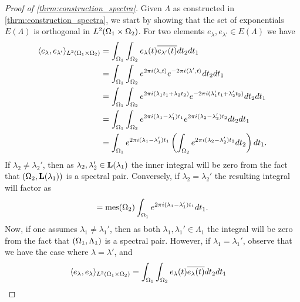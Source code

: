 \documentclass[../thesis.tex]{subfiles}
\begin{document}
\begin{proof}[Proof of  \cref{thrm:construction_spectra}] %
    Given $\Lambda$ as constructed in \cref{thrm:construction_spectra}, we start by showing that the set of exponentials $E(\Lambda)$ is orthogonal in $L^2(\Omega_1 \times \Omega_2)$. For two elements $e_\lambda,e_{\lambda'} \in E(\Lambda)$ we have %
    \begin{align*}
        \langle e_\lambda,e_{\lambda'}\rangle_{L^2(\Omega_1 \times \Omega_2)} 
        &= \int_{\Omega_1} \int_{\Omega_2} e_{\lambda}(t) \overline{e_{\lambda'}(t)} dt_2 dt_1\\ 
        &= \int_{\Omega_1} \int_{\Omega_2} e^{2\pi i \langle\lambda, t\rangle } e^{-2\pi i  \langle\lambda', t\rangle} dt_2 dt_1\\ 
        &= \int_{\Omega_1} \int_{\Omega_2} e^{2\pi i (\lambda_1 t_1+\lambda_2 t_2)} e^{-2\pi i(\lambda_1' t_1+\lambda_2' t_2)} dt_2 dt_1\\ 
        &= \int_{\Omega_1} \int_{\Omega_2} e^{2\pi i (\lambda_1- \lambda_1')t_1} e^{2\pi i (\lambda_2 - \lambda_2')t_2} dt_2 dt_1\\ 
        &= \int_{\Omega_1} e^{2\pi i  (\lambda_1- \lambda_1')t_1} \left(\int_{\Omega_2}  e^{2\pi i (\lambda_2 - \lambda_2')t_2} dt_2\right) dt_1.
    \end{align*}
    If $\lambda_2 \neq \lambda_2'$, then as $\lambda_2, \lambda_2' \in \mathbf{L}(\lambda_1)$ the inner integral will be zero from the fact that $(\Omega_2, \mathbf{L}(\lambda_1))$ is a spectral pair. Conversely, if $\lambda_2 = \lambda_2'$ the resulting integral will factor as %
    \begin{align*}
        = \operatorname{mes}(\Omega_2) \int_{\Omega_1} e^{2\pi i  (\lambda_1- \lambda_1')t_1} dt_1.
    \end{align*}
    Now, if one assumes $\lambda_1 \neq \lambda_1'$, then as both $\lambda_1, \lambda_1' \in \Lambda_1$ the integral will be zero from the fact that $(\Omega_1, \Lambda_1)$ is a spectral pair. However, if $\lambda_1 = \lambda_1'$, observe that we have the case where $\lambda = \lambda'$, and
    \begin{align*}
        \braa{e_\lambda, e_\lambda}_{L^2\brac{\Omega_1 \times \Omega_2}}
        &= \int_{\Omega_1} \int_{\Omega_2} e_{\lambda}(t) \overline{e_{\lambda}(t)} dt_2 dt_1

\end{align*}
\end{proof}
\end{document}

